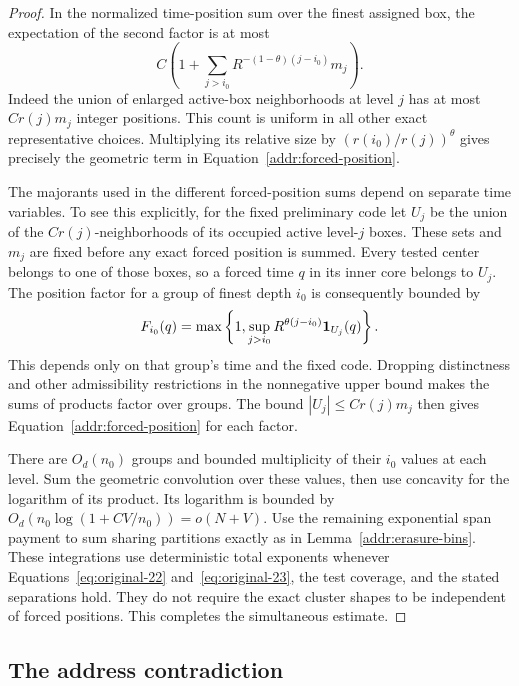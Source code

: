 \begin{proof}
In the normalized time-position sum over the finest assigned box,
the expectation of the second factor is at most
\begin{equation}\label{addr:forced-position}
                  C\left(
                    1+\sum_{j>i_0}
                       R^{-(1-\theta)(j-i_0)}m_j
                    \right).
\end{equation}
Indeed the union of enlarged active-box neighborhoods at level
$j$ has at most $Cr(j)m_j$ integer positions.  This count is
uniform in all other exact representative choices.  Multiplying
its relative size by $(r(i_0)/r(j))^\theta$ gives precisely
the geometric term in Equation~\eqref{addr:forced-position}.

The majorants used in the different forced-position sums depend on separate
time variables. To see this explicitly, for the fixed preliminary code let
$U_j$ be the union of the $Cr(j)$-neighborhoods of its occupied active
level-$j$ boxes. These sets and $m_j$ are fixed before any exact forced
position is summed. Every tested center belongs to one of those boxes, so
a forced time $q$ in its inner core belongs to $U_j$. The position factor
for a group of finest depth $i_0$ is consequently bounded by
\[
 F_{i_0}(q)=\max\left\{1,\sup_{j>i_0}
               R^{\theta(j-i_0)}\mathbf 1_{U_j}(q)\right\}.
\]
This depends only on that group's time and the fixed code. Dropping
distinctness and other admissibility restrictions in the nonnegative upper
bound makes the sums of products factor over groups. The bound
$|U_j|\le Cr(j)m_j$ then gives Equation~\eqref{addr:forced-position}
for each factor.

There are $O_d(n_0)$ groups and bounded multiplicity of their
$i_0$ values at each level.  Sum the geometric convolution over
these values, then use concavity for the logarithm of its product.
Its logarithm is bounded by
$O_d(n_0\log(1+C V/n_0))=o(N+V)$.
Use the remaining exponential span payment to sum sharing
partitions exactly as in Lemma~\ref{addr:erasure-bins}.
These integrations use deterministic total exponents whenever
Equations~\eqref{eq:original-22} and~\eqref{eq:original-23},
the test coverage, and the stated separations hold.  They do not
require the exact cluster shapes to be independent of forced
positions.  This completes the simultaneous estimate.
\end{proof}

\subsection{The address contradiction}

